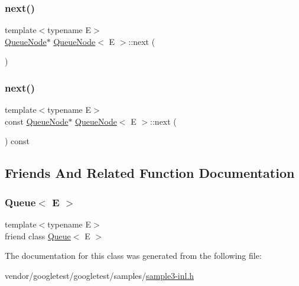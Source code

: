 \mbox{\label{class_queue_node_a8a9fdf488da06533360999ef85db56ea}} 
\subsubsection{\texorpdfstring{next()}{next()}\hspace{0.1cm}{\footnotesize\ttfamily [1/2]}}
{\footnotesize\ttfamily template$<$typename E$>$ \\
\hyperlink{class_queue_node}{Queue\+Node}$\ast$ \hyperlink{class_queue_node}{Queue\+Node}$<$ E $>$\+::next (\begin{DoxyParamCaption}{ }\end{DoxyParamCaption})\hspace{0.3cm}{\ttfamily [inline]}}

\mbox{\label{class_queue_node_ada477e4f309f29383112dbda473dd985}} 
\subsubsection{\texorpdfstring{next()}{next()}\hspace{0.1cm}{\footnotesize\ttfamily [2/2]}}
{\footnotesize\ttfamily template$<$typename E$>$ \\
const \hyperlink{class_queue_node}{Queue\+Node}$\ast$ \hyperlink{class_queue_node}{Queue\+Node}$<$ E $>$\+::next (\begin{DoxyParamCaption}{ }\end{DoxyParamCaption}) const\hspace{0.3cm}{\ttfamily [inline]}}



\subsection{Friends And Related Function Documentation}
\mbox{\label{class_queue_node_ad4336229b1d7c3626e4ba69f236b202d}} 
\subsubsection{\texorpdfstring{Queue$<$ E $>$}{Queue< E >}}
{\footnotesize\ttfamily template$<$typename E$>$ \\
friend class \hyperlink{class_queue}{Queue}$<$ E $>$\hspace{0.3cm}{\ttfamily [friend]}}



The documentation for this class was generated from the following file\+:\begin{DoxyCompactItemize}
\item 
vendor/googletest/googletest/samples/\hyperlink{sample3-inl_8h}{sample3-\/inl.\+h}\end{DoxyCompactItemize}

